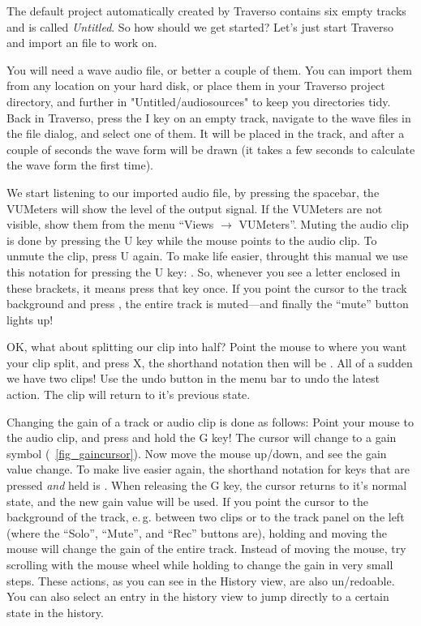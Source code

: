 The default project automatically created by Traverso contains six empty tracks and is called \emph{Untitled}. So how should we get started?
Let's just start Traverso and import an file to work on.

You will need a wave audio file, or better a couple of them. You can import them from any location on your hard disk, or place them in your Traverso project directory, and further in "Untitled/audiosources" to keep you directories tidy. Back in Traverso, press the I key on an empty track, navigate to the wave files in the file dialog, and select one of them. It will be placed in the track, and after a couple of seconds the wave form will be drawn (it takes a few seconds to calculate the wave form the first time).

We start listening to our imported audio file, by pressing the spacebar, the VUMeters will show the level of the output signal. If the VUMeters are not visible, show them from the menu ``Views $\rightarrow$ VUMeters''. Muting the audio clip is done by pressing the U key while the mouse points to the audio clip. To unmute the clip, press U again. To make life easier, throught this manual we use this notation for pressing the U key: . So, whenever you see a letter enclosed in these brackets, it means press that key once. If you point the cursor to the track background and press , the entire track is muted---and finally the ``mute'' button lights up!

OK, what about splitting our clip into half? Point the mouse to where you want your clip split, and press X, the shorthand notation then will be . All of a sudden we have two clips! Use the undo button in the menu bar to undo the latest action. The clip will return to it's previous state.

Changing the gain of a track or audio clip is done as follows: Point your mouse to the audio clip, and press and hold the G key! The cursor will change to a gain symbol (\FigB\ \ref{fig_gaincursor}). Now move the mouse up/down, and see the gain value change. To make live easier again, the shorthand notation for keys that are pressed \emph{and} held is . When releasing the G key, the cursor returns to it's normal state, and the new gain value will be used. If you point the cursor to the background of the track, e.\,g. between two clips or to the track panel on the left (where the ``Solo'', ``Mute'', and ``Rec'' buttons are), holding  and moving the mouse will change the gain of the entire track. Instead of moving the mouse, try scrolling with the mouse wheel while holding  to change the gain in very small steps. These actions, as you can see in the History view, are also un/redoable. You can also select an entry in the history view to jump directly to a certain state in the history.

